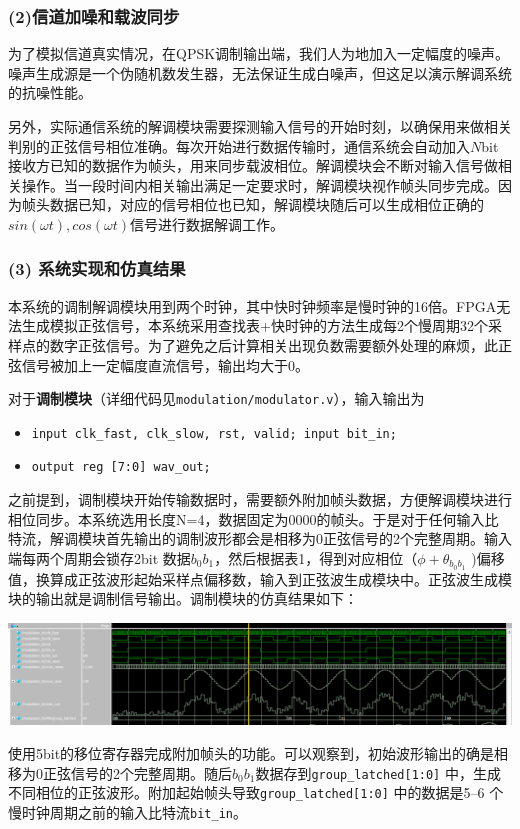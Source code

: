 \subsubsection*{\normalfont (2)信道加噪和载波同步}
为了模拟信道真实情况，在QPSK调制输出端，我们人为地加入一定幅度的噪声。噪声生成源是一个伪随机数发生器，无法保证生成白噪声，但这足以演示解调系统的抗噪性能。\par

另外，实际通信系统的解调模块需要探测输入信号的开始时刻，以确保用来做相关判别的正弦信号相位准确。每次开始进行数据传输时，通信系统会自动加入$N$bit接收方已知的数据作为帧头，用来同步载波相位。解调模块会不断对输入信号做相关操作。当一段时间内相关输出满足一定要求时，解调模块视作帧头同步完成。因为帧头数据已知，对应的信号相位也已知，解调模块随后可以生成相位正确的$sin(\omega t), cos(\omega t)$信号进行数据解调工作。

\subsubsection*{\normalfont (3) 系统实现和仿真结果}
本系统的调制解调模块用到两个时钟，其中快时钟频率是慢时钟的16倍。FPGA无法生成模拟正弦信号，本系统采用查找表+快时钟的方法生成每2个慢周期32个采样点的数字正弦信号。为了避免之后计算相关出现负数需要额外处理的麻烦，此正弦信号被加上一定幅度直流信号，输出均大于0。\par

对于\textbf{调制模块}（详细代码见\texttt{modulation/modulator.v}），输入输出为
\begin{itemize}
\item \texttt{input clk\_fast, clk\_slow, rst, valid; input bit\_in;}
\item \texttt{output reg [7:0] wav\_out;}
\end{itemize}
之前提到，调制模块开始传输数据时，需要额外附加帧头数据，方便解调模块进行相位同步。本系统选用长度N=4，数据固定为0000的帧头。于是对于任何输入比特流，解调模块首先输出的调制波形都会是相移为0正弦信号的2个完整周期。输入端每两个周期会锁存2bit 数据$b_0b_1$，然后根据表1，得到对应相位（$\phi+\theta_{b_0b_1}$ )偏移值，换算成正弦波形起始采样点偏移数，输入到正弦波生成模块中。正弦波生成模块的输出就是调制信号输出。调制模块的仿真结果如下：\par
\vspace{10pt}
\includegraphics[width = .9\textwidth]{images//modulator_out.png}\vspace{10pt}\par
使用5bit的移位寄存器完成附加帧头的功能。可以观察到，初始波形输出的确是相移为0正弦信号的2个完整周期。随后$b_0b_1$数据存到\texttt{group\_latched[1:0]} 中，生成不同相位的正弦波形。附加起始帧头导致\texttt{group\_latched[1:0]} 中的数据是5--6 个慢时钟周期之前的输入比特流\texttt{bit\_in}。\par\par

